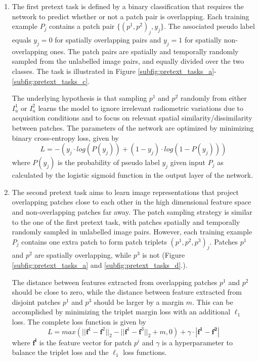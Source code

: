 \documentclass[runningheads]{llncs}
\begin{document}
\begin{enumerate}
\item The first pretext task is defined by a binary classification that requires the network to predict whether or not a patch pair is overlapping. Each training example $\mathit{P_j}$ contains a patch pair $\{(\mathit{p^1}, \mathit{p^2})_j,y_j\}$. The associated pseudo label equals $y_{j} = 0$ for spatially overlapping pairs and $y_{j} = 1$ for spatially non-overlapping ones. The patch pairs are spatially and temporally randomly sampled from the unlabelled image pairs, and equally divided over the two classes. The task is illustrated in Figure \ref{subfig:pretext_tasks_a}-\ref{subfig:pretext_tasks_c}.

The underlying hypothesis is that sampling $\mathit{p^1}$ and $\mathit{p^2}$ randomly from either $I_u^1$ or $I_u^2$ learns the model to ignore irrelevant radiometric variations due to acquisition conditions and to focus on relevant spatial similarity/dissimilarity between patches. 
The parameters of the network are optimized by minimizing binary cross-entropy loss, given by 
\begin{equation} \label{eq:loss_binary_cross_entroply}
    L = - (y_{j} \cdot log({P}(y_{j})) + (1-y_{j}) \cdot log(1 - {P}(y_{j}))) 
\end{equation}
where ${P}(y_j)$ is the probability of pseudo label $y_j$ given input $P_j$ as calculated by the logistic sigmoid function in the output layer of the network. 

\item The second pretext task aims to learn image representations that project overlapping patches close to each other in the high dimensional feature space and non-overlapping patches far away. The patch sampling strategy is similar to the one of the first pretext task, with patches spatially and temporally randomly sampled in unlabelled image pairs. However, each training example $P_j$ contains one extra patch to form patch triplets $({p^1}, {p^2}, {p^3})_j$. Patches ${p^1}$ and ${p^2}$ are spatially overlapping, while ${p^3}$ is not (Figure \ref{subfig:pretext_tasks_a} and \ref{subfig:pretext_tasks_d}.). 

The distance between features extracted from overlapping patches ${p^1}$ and ${p^2}$ should be close to zero, while the distance between feature extracted from disjoint patches ${p^1}$ and ${p^3}$ should be larger by a margin $m$. This can be accomplished by minimizing the triplet margin loss with an additional $\ell_1$ loss. The complete loss function is given by
\begin{equation}
    L = max(||\mathbf{f}^1 - \mathbf{f}^2||_2 - ||\mathbf{f}^1 - \mathbf{f}^3||_2 + m, 0) + \gamma \cdot |\mathbf{f^1} - \mathbf{f^2}|
    \label{eq:pt2}
\end{equation}
where $\mathbf{f^i}$ is the feature vector for patch ${p^i}$ and $\gamma$ is a hyperparameter to balance the triplet loss and the $\ell_1$ loss functions. \end{enumerate}
\end{document}
